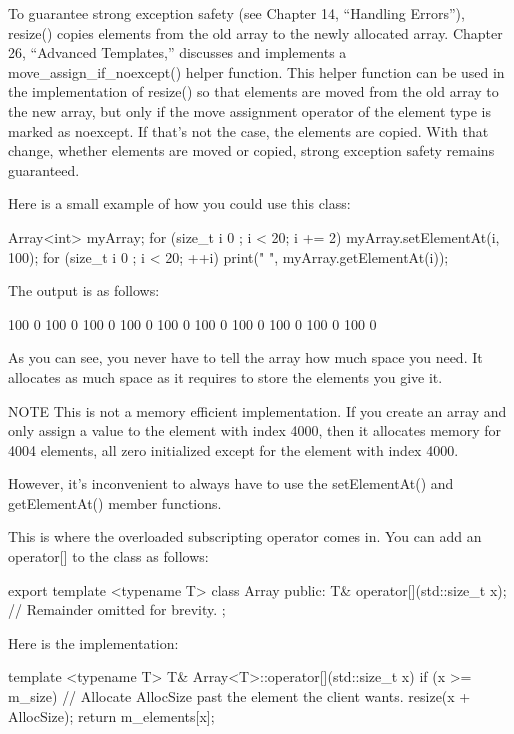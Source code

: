 To guarantee strong exception safety (see Chapter 14, “Handling Errors”), resize() copies elements from the old array to the newly allocated array. Chapter 26, “Advanced Templates,” discusses and implements a move\_assign\_if\_noexcept() helper function. This helper function can be used in the implementation of resize() so that elements are moved from the old array to the new array, but only if the move assignment operator of the element type is marked as noexcept. If that’s not the case, the elements are copied. With that change, whether elements are moved or copied, strong exception safety remains guaranteed.

Here is a small example of how you could use this class:

\begin{cpp}
Array<int> myArray;
for (size_t i { 0 }; i < 20; i += 2) {
    myArray.setElementAt(i, 100);
}
for (size_t i { 0 }; i < 20; ++i) {
    print("{} ", myArray.getElementAt(i));
}
\end{cpp}

The output is as follows:

\begin{shell}
100 0 100 0 100 0 100 0 100 0 100 0 100 0 100 0 100 0 100 0
\end{shell}

As you can see, you never have to tell the array how much space you need. It allocates as much space as it requires to store the elements you give it.

\begin{myNotic}{NOTE}
This is not a memory efficient implementation. If you create an array and only assign a value to the element with index 4000, then it allocates memory for 4004 elements, all zero initialized except for the element with index 4000.
\end{myNotic}

However, it’s inconvenient to always have to use the setElementAt() and getElementAt() member functions.

This is where the overloaded subscripting operator comes in. You can add an operator[] to the class as follows:

\begin{cpp}
export template <typename T>
class Array
{
    public:
        T& operator[](std::size_t x);
        // Remainder omitted for brevity.
};
\end{cpp}

Here is the implementation:

\begin{cpp}
template <typename T> T& Array<T>::operator[](std::size_t x)
{
    if (x >= m_size) {
        // Allocate AllocSize past the element the client wants.
        resize(x + AllocSize);
    }
    return m_elements[x];
}
\end{cpp}

